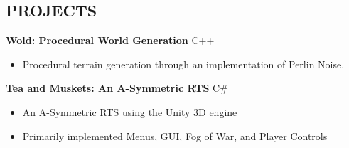 \documentclass[margin,11pt]{res} %
\begin{document}
\begin{resume}
\section{PROJECTS}

{\bf Wold: Procedural World Generation} \hfill C++ \\
\begin{itemize}
\item Procedural terrain generation through an implementation of Perlin Noise.
\end{itemize}

{\bf Tea and Muskets: An A-Symmetric RTS} \hfill C\#
\begin{itemize}
\item An A-Symmetric RTS using the Unity 3D engine
\item Primarily implemented Menus, GUI, Fog of War, and Player Controls
\end{itemize}

\end{resume} 
\end{document}
